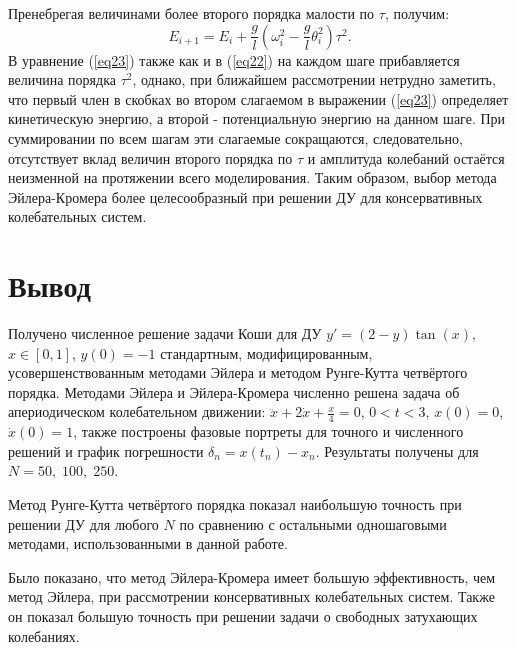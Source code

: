 \documentclass[
11pt,
master, %
subf, %
href, %
colorlinks=true, %
times, %
]{disser}
\begin{document}
Пренебрегая величинами более второго порядка малости по $\tau$, получим:
\begin{equation}\label{eq23}
    E_{i+1} = E_i + \frac{g}{l}\left(\omega_i^2 - \frac{g}{l}\theta_i^2\right)\tau^2.
\end{equation}
В уравнение (\ref{eq23}) также как и в (\ref{eq22}) на каждом шаге прибавляется величина порядка $\tau^2$, однако, при ближайшем рассмотрении нетрудно заметить, что первый член в скобках во втором слагаемом в выражении (\ref{eq23}) определяет кинетическую энергию, а второй - потенциальную энергию на данном шаге. При суммировании по всем шагам эти слагаемые сокращаются, следовательно, отсутствует вклад величин второго порядка по $\tau$ и амплитуда колебаний остаётся неизменной на протяжении всего моделирования. Таким образом, выбор метода Эйлера-Кромера более целесообразный при решении ДУ для консервативных колебательных систем.

\newpage
\section{Вывод}
Получено численное решение задачи Коши для ДУ $y' = (2-y) \tan(x)$, $x\in [0,1]$, $y(0) = -1$ стандартным, модифицированным, усовершенствованным методами Эйлера и методом Рунге-Кутта четвёртого порядка. Методами Эйлера и Эйлера-Кромера  численно решена задача об апериодическом колебательном движении: $\ddot{x} + 2 \dot{x} + \frac{x}{4} = 0$, $0<t<3$, $x(0) = 0$, $\dot{x}(0) = 1$, также построены фазовые портреты для точного и численного решений и график погрешности $\delta_n = x(t_n) - x_n$. Результаты получены для $N = 50,\;100,\;250$.

Метод Рунге-Кутта четвёртого порядка показал наибольшую точность при решении ДУ для любого $N$ по сравнению с остальными одношаговыми методами, использованными в данной работе.

Было показано, что метод Эйлера-Кромера имеет большую эффективность, чем метод Эйлера, при рассмотрении консервативных колебательных систем. Также он показал большую точность при решении задачи о свободных затухающих колебаниях.
\end{document}
